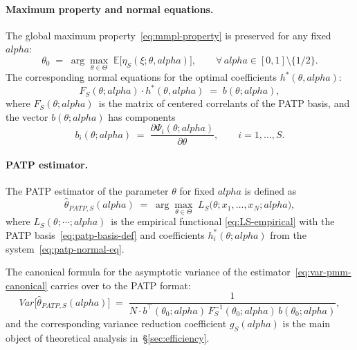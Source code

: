 \documentclass[11pt]{article}
\def\alpha{alpha}%
\def\vec#1{#1}%
\def\mathbf#1{#1}%
\def\mathrm#1{#1}%
\def\tfrac#1#2{#1/#2}%
\theoremstyle{definition}
\newcommand{\E}{\mathbb{E}}
\newcommand{\Var}{\mathrm{Var}}
\newcommand{\PATP}{\mathrm{PATP}}
\begin{document}
\paragraph{Maximum property and normal equations.}
The global maximum property~\eqref{eq:mmpl-property} is preserved for any
fixed $\alpha$:
\begin{equation}\label{eq:patp-max-property}
  \theta_0
  \;=\; \arg\max_{\theta \in \Theta}\;
        \E\bigl[\eta_S(\xi; \theta, \alpha)\bigr],
  \qquad \forall\,\alpha \in [0, 1]\setminus\{\tfrac{1}{2}\}.
\end{equation}
The corresponding normal equations for the optimal coefficients
$\vec h^{*}(\theta, \alpha)$:
\begin{equation}\label{eq:patp-normal-eq}
  \mathbf{F}_S(\theta; \alpha) \cdot \vec h^{*}(\theta, \alpha)
  \;=\; \vec b(\theta; \alpha),
\end{equation}
where $\mathbf{F}_S(\theta; \alpha)$~is the matrix of centered correlants
of the PATP basis, and the vector $\vec b(\theta; \alpha)$ has components
\begin{equation}\label{eq:b-patp}
  b_i(\theta; \alpha)
  \;=\; \frac{\partial \Psi_i(\theta; \alpha)}{\partial \theta},
  \qquad i = 1, \ldots, S.
\end{equation}

\paragraph{PATP estimator.}
The PATP estimator of the parameter $\theta$ for fixed $\alpha$ is defined as
\begin{equation}\label{eq:patp-estimator}
  \hat\theta_{\PATP,S}(\alpha)
  \;=\; \arg\max_{\theta \in \Theta}\;
        L_S\bigl(\theta; x_1, \ldots, x_N; \alpha\bigr),
\end{equation}
where $L_S(\theta; \cdots; \alpha)$~is the empirical functional
\eqref{eq:LS-empirical} with the PATP basis~\eqref{eq:patp-basis-def} and
coefficients $h_i^{*}(\theta; \alpha)$ from the system~\eqref{eq:patp-normal-eq}.

The canonical formula for the asymptotic variance of the
estimator~\eqref{eq:var-pmm-canonical} carries over to the PATP format:
\begin{equation}\label{eq:patp-variance}
  \Var\bigl[\hat\theta_{\PATP,S}(\alpha)\bigr]
  \;=\; \frac{1}{N \cdot
                \vec b^{\top}(\theta_0; \alpha)\,
                \mathbf{F}_S^{-1}(\theta_0; \alpha)\,
                \vec b(\theta_0; \alpha)},
\end{equation}
and the corresponding variance reduction coefficient $g_S(\alpha)$ is the
main object of theoretical analysis in~\S\ref{sec:efficiency}.
\end{document}
